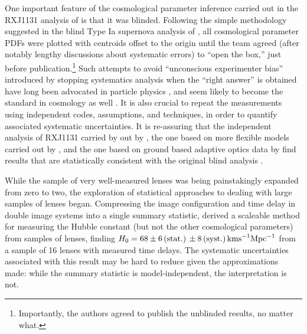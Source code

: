 One important feature of the cosmological parameter inference carried
out in the RXJ1131 analysis of \citet{Suy++13} is that it was blinded.
Following the simple methodology suggested in the blind Type Ia
supernova analysis of \citet{Con++06}, all cosmological parameter PDFs
were plotted with centroids offset to the origin until the team agreed
(after notably lengthy discussions about systematic errors) to ``open
the box,'' just before publication.\footnote{Importantly, the authors
agreed to publish the unblinded results, no matter what.} Such
attempts to avoid ``unconscious experimenter bias'' introduced by
stopping systematics analysis when the ``right answer'' is obtained
have long been advocated in particle physics
\citep{klein2005blind}, and seem likely to become the standard in
cosmology as well \citep[e.g.][]{STEP,DESWL}. It is also crucial to
repeat the measurements using independent codes, assumptions, and
techniques, in order to quantify associated systematic
uncertainties. It is re-assuring that the independent analysis of
RXJ1131 carried by out by \citet{BAR16}, the one based on
more flexible models carried out by \citet{Suy++14}, and the one based
on ground based adaptive optics data by \citet{Che++16} find results that are
statistically consistent with the original blind analysis \citep{Suy++13}.

While the sample of very well-measured lenses was being painstakingly
expanded from zero to two, the exploration of statistical approaches
to dealing with large samples of lenses began.  Compressing the image
configuration and time delay in double image systems into a single
summary statistic, \citet{Ogu07b} derived a scaleable method for
measuring the Hubble constant (but not the other cosmological
parameters) from samples of lenses, finding
$H_0=68\pm6\,{\rm(stat.)}\,\pm8\,{\rm (syst.)}\,{\rm km s}^{-1}{\rm
Mpc}^{-1}$ from a sample of 16 lenses with measured time delays. The
systematic uncertainties associated with this result may be hard to
reduce given the approximations made: while the summary statistic is
model-independent, the interpretation is not.

